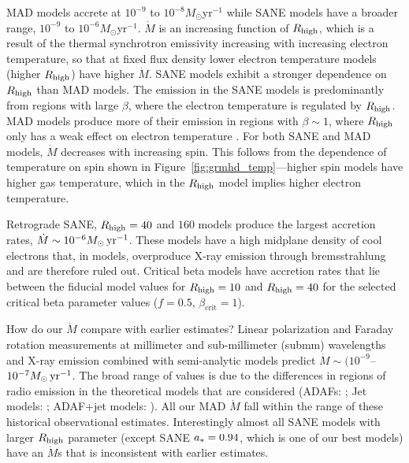 MAD models accrete at $10^{-9}$ to $10^{-8} M_{\odot}$yr$^{-1}$ while SANE models have a broader range, $10^{-9}$ to $10^{-6} M_{\odot}$yr$^{-1}$.
$\dot{M}$ is an increasing function of $R_\mathrm{high}$, which is a result of the thermal synchrotron emissivity increasing with increasing electron temperature, so that at fixed flux density lower electron temperature models (higher $R_\mathrm{high}$) have higher $\dot{M}$.  
SANE models exhibit a stronger dependence on $R_\mathrm{high}$ than MAD models.
The emission in the SANE models is predominantly from regions with large $\beta$, where the electron temperature is regulated by $R_\mathrm{high}$.
MAD models produce more of their emission in regions with $\beta\sim 1$, where $R_\mathrm{high}$ only has a weak effect on electron temperature  \citep[see][Fifgure~4]{M87PaperV}.
For both SANE and MAD models, $\dot{M}$ decreases with increasing spin.
This follows from the dependence of temperature on spin shown in Figure~\ref{fig:grmhd_temp}---higher spin models have higher gas temperature, which in the $R_\mathrm{high}$ model implies higher electron temperature.

Retrograde SANE, $R_\mathrm{high}=40$ and $160$ models produce the largest accretion rates, $\dot{M} \sim 10^{-6}M_{\odot}\,\mathrm{yr}^{-1}$.
These models have a high midplane density of cool electrons that, in \kharma models, overproduce X-ray emission through bremsstrahlung and are therefore ruled out.
Critical beta models have accretion rates that lie between the fiducial model values for $R_\mathrm{high} = 10$ and $R_\mathrm{high} = 40$ for the selected critical beta parameter values ($f=0.5$, $\beta_\mathrm{crit}=1$).

How do our $\dot{M}$ compare with earlier estimates?
Linear polarization and Faraday rotation measurements at millimeter and sub-millimeter (submm) wavelengths \citep{2000ApJ...538L.121A, 2000ApJ...545..842Q, 2003ApJ...588..331B, 2006ApJ...640..308M, 2006JPhCS..54..354M, 2006ApJ...646L.111M} and X-ray emission \citep{2003ApJ...591..891B, doi:10.1126/science.1240755} combined  with semi-analytic models predict $\dot{M} \sim (10^{-9}$--$10^{-7} M_{\odot}\,\mathrm{yr}^{-1}$.
The broad range of values is due to the differences in regions of radio emission in the theoretical models that are considered (ADAFs: \citealt{1998ApJ...492..554N, Yuan_2003}; Jet models: \citealt{1993A&A...278L...1F, 2000A&A...362..113F}; ADAF+jet models: \citealt{2002A&A...383..854Y}).
All our MAD $\dot{M}$ fall within the range of these historical observational estimates.
Interestingly almost all SANE models with larger $R_\mathrm{high}$ parameter (except SANE $a_*=0.94$, which is one of our best models) have an $\dot{M}$s that is inconsistent with earlier estimates.

